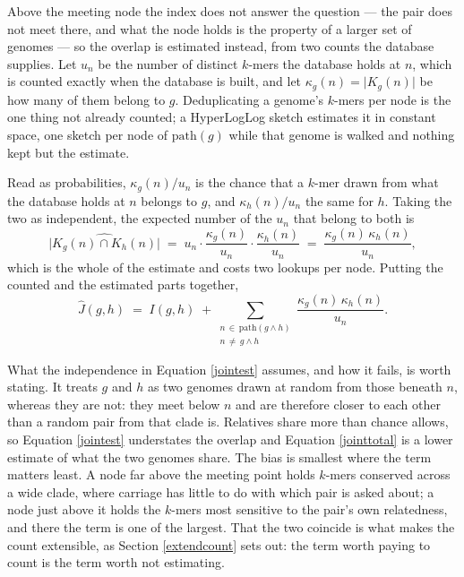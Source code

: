 \documentclass[pdflatex,sn-vancouver-num]{sn-jnl}
\begin{document}
Above the meeting node the index does not answer the question --- the pair does not meet there, and
what the node holds is the property of a larger set of genomes --- so the overlap is estimated
instead, from two counts the database supplies. Let $u_n$ be the number of distinct $k$-mers the
database holds at $n$, which is counted exactly when the database is built, and let $\kappa_g(n) =
\lvert K_g(n) \rvert$ be how many of them belong to $g$. Deduplicating a genome's $k$-mers per node
is the one thing not already counted; a HyperLogLog sketch \cite{flajolet2007hyperloglog} estimates
it in constant space, one sketch per node of $\mathrm{path}(g)$ while that genome is walked and
nothing kept but the estimate.

Read as probabilities, $\kappa_g(n)/u_n$ is the chance that a $k$-mer drawn from what the database
holds at $n$ belongs to $g$, and $\kappa_h(n)/u_n$ the same for $h$. Taking the two as independent,
the expected number of the $u_n$ that belong to both is
%
\begin{equation}
  \widehat{\lvert K_g(n) \cap K_h(n) \rvert} \;=\;
    u_n \cdot \frac{\kappa_g(n)}{u_n} \cdot \frac{\kappa_h(n)}{u_n}
  \;=\; \frac{\kappa_g(n)\,\kappa_h(n)}{u_n} ,
  \label{jointest}
\end{equation}
%
which is the whole of the estimate and costs two lookups per node. Putting the counted and the
estimated parts together,
%
\begin{equation}
  \widehat{J}(g,h) \;=\; I(g,h) \;+\!\!
    \sum_{\substack{n \,\in\, \mathrm{path}(g \wedge h) \\ n \,\neq\, g \wedge h}}
    \frac{\kappa_g(n)\,\kappa_h(n)}{u_n} .
  \label{jointtotal}
\end{equation}

What the independence in Equation \eqref{jointest} assumes, and how it fails, is worth stating.
It treats $g$ and $h$ as two genomes drawn at random from those beneath $n$, whereas they are not:
they meet below $n$ and are therefore closer to each other than a random pair from that clade is.
Relatives share more than chance allows, so Equation \eqref{jointest} understates the overlap and
Equation \eqref{jointtotal} is a lower estimate of what the two genomes share. The bias is smallest
where the term matters least. A node far above the meeting point holds $k$-mers conserved across a
wide clade, where carriage has little to do with which pair is asked about; a node just above it
holds the $k$-mers most sensitive to the pair's own relatedness, and there the term is one of the
largest. That the two coincide is what makes the count extensible, as
Section \ref{extendcount} sets out: the term worth paying to count is the term worth not estimating.
\end{document}
